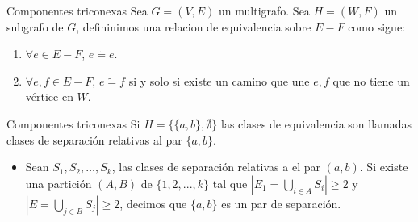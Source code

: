 \documentclass[spanish]{beamer}
\begin{document}
\begin{frame}{Componentes triconexas}
Sea $G = (V, E)$ un multigrafo. Sea $H = (W, F)$ un subgrafo de $G$, defininimos una relacion de equivalencia sobre $E - F$ como sigue:
  \begin{definitions}
    \begin{enumerate}
    \item $\forall e \in E - F$, $e \widetilde{=} e$.
    \item $\forall e, f \in E - F$, $e \widetilde{=} f$ si y solo si existe un camino que une $e, f$ que no tiene un vértice en $W$.
    \end{enumerate}
  \end{definitions}
\end{frame}

\begin{frame}{Componentes triconexas}
Si $H = \{\{a, b\}, \emptyset\}$ las clases de equivalencia son llamadas clases de separación relativas al par $\{a, b\}$.
  \begin{definitions}
    \begin{itemize}
      \item Sean $S_1,S_2,\ldots, S_k$, las clases de separación relativas a el par $(a,b)$. Si existe una partición $(A,B)$ de $\{1,2, . . . , k\}$ tal que $|E_1 = \bigcup_{i \in A} S_i| \geq 2$ y $ |E= \bigcup_{j \in B} S_j| \geq 2$, decimos que $\{a,b\}$ es un par de separación.
    \end{itemize}
  \end{definitions}
\end{frame}
\end{document}
